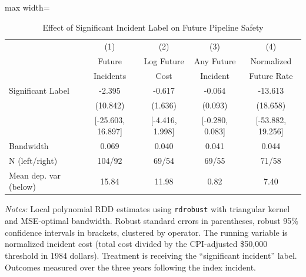 \begin{table}[htbp]
\centering
\caption{Effect of Significant Incident Label on Future Pipeline Safety}
\label{tab:main}
\begin{adjustbox}{max width=\textwidth}
\begin{tabular}{lcccc}
\hline\hline
 & (1) & (2) & (3) & (4) \\
 & Future & Log Future & Any Future & Normalized \\
 & Incidents & Cost & Incident & Future Rate \\
\hline
Significant Label & -2.395 & -0.617 & -0.064 & -13.613 \\
 & (10.842) & (1.636) & (0.093) & (18.658) \\
 & {[}-25.603, 16.897{]} & {[}-4.416, 1.998{]} & {[}-0.280, 0.083{]} & {[}-53.882, 19.256{]} \\
\hline
Bandwidth & 0.069 & 0.040 & 0.041 & 0.044 \\
N (left/right) & 104/92 & 69/54 & 69/55 & 71/58 \\
Mean dep. var (below) & 15.84 & 11.98 & 0.82 & 7.40 \\
\hline\hline
\end{tabular}
\end{adjustbox}
\par\vspace{0.3em}
{\small
\textit{Notes:} Local polynomial RDD estimates using \texttt{rdrobust}  with triangular kernel and MSE-optimal bandwidth. Robust standard errors in  parentheses, robust 95\% confidence intervals in brackets, clustered by operator.  The running variable is normalized incident cost (total cost divided by the  CPI-adjusted \$50,000 threshold in 1984 dollars). Treatment is receiving the  ``significant incident'' label. Outcomes measured over the three years following the index incident.
}
\end{table}
